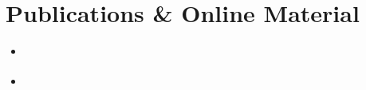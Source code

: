 \documentclass[12pt]{article}
\renewcommand\cite{\citep}  %
\newcommand{\CJ}{\pazocal{J}}
\begin{document}
	

\cleardoublepage
\section*{Publications \& Online Material}
\begin{itemize}
	\item \cite{vouros2019empirical}
	\item \cite{vouros2020semi}
\end{itemize}	
	
\end{document}
